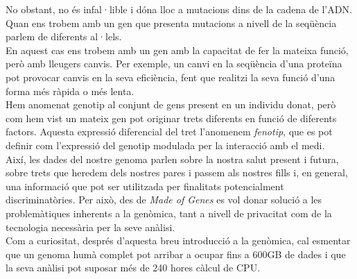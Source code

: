 \newline No obstant, no és infal·lible i dóna lloc a mutacions dins de la cadena de l'ADN.\\
\newline Quan ens trobem amb un gen que presenta mutacions a nivell de la seqüència parlem de diferents al·lels.\\
\newline En aquest cas ens trobem amb un gen amb la capacitat de fer la mateixa funció, però amb lleugers canvis. Per exemple, un canvi en la seqüència d’una proteïna pot provocar canvis en la seva eficiència, fent que realitzi la seva funció d'una forma més ràpida o més lenta.\\
\newline Hem anomenat genotip al conjunt de gens present en un individu donat, però com hem vist un mateix gen pot originar trets diferents en funció de diferents factors. Aquesta expressió diferencial del tret l’anomenem \textit{fenotip}, que es pot definir com l’expressió del genotip modulada per la interacció amb el medi.\\
\newline  Així, les dades del nostre genoma parlen sobre la nostra salut present i futura, sobre trets que heredem dels nostres pares i passem als nostres fills i, en general, una informació que pot ser utilitzada per finalitats potencialment discriminatòries. Per això, des de \textit{Made of Genes} es vol donar solució a les problemàtiques inherents a la genòmica, tant a nivell de privacitat com de la tecnologia necessària per la seve anàlisi.\\
\newline Com a curiositat, després d'aquesta breu introducció a la genòmica, cal esmentar que un genoma humà complet pot arribar a ocupar fins a 600GB de dades i que la seva anàlisi pot suposar més de 240 hores càlcul de CPU.\\

